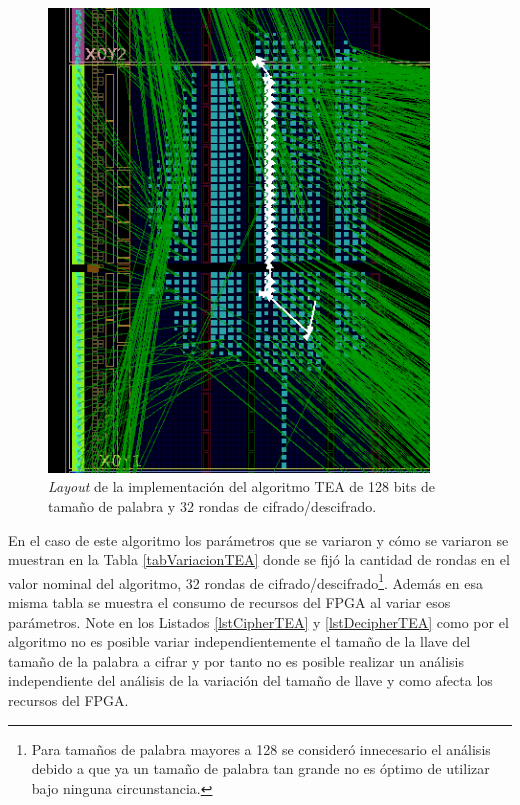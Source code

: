 \begin{figure}[H]
	\centering
	\includegraphics[width=0.9\textwidth]{./images/fig128_32_layout}
	\caption{\textit{Layout} de la implementación del algoritmo TEA de 128 bits de tamaño de palabra y 32 rondas de cifrado/descifrado.}
	\label{fig128_32_layout}
\end{figure}


En el caso de este algoritmo los parámetros que se variaron y cómo se variaron se muestran en la Tabla \ref{tabVariacionTEA} donde se fijó la cantidad de rondas en el valor nominal del algoritmo, 32 rondas de cifrado/descifrado\footnote{Para tamaños de palabra mayores a 128 se consideró innecesario el análisis debido a que ya un tamaño de palabra tan grande no es óptimo de utilizar bajo ninguna circunstancia.}.  Además en esa misma tabla se muestra el consumo de recursos del FPGA al variar esos parámetros. Note en los Listados \ref{lstCipherTEA} y \ref{lstDecipherTEA} como por el algoritmo no es posible variar independientemente el tamaño de la llave del tamaño de la palabra a cifrar y por tanto no es posible realizar un análisis independiente del análisis de la variación del tamaño de llave y como afecta los recursos del FPGA. 


